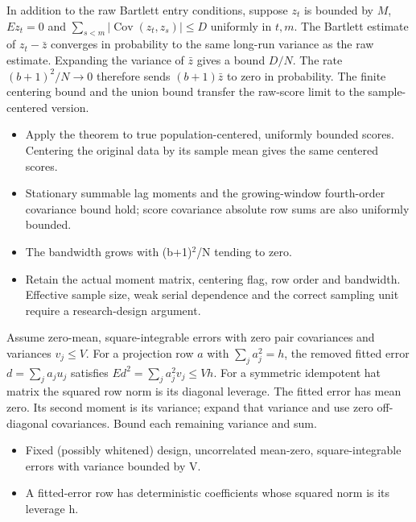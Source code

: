 \expandafter\def\csname statadic@statement@STATADIC-HAC-007\endcsname{In addition to the raw Bartlett entry conditions, suppose
  $z_t$ is bounded by $M$, $E z_t=0$ and
  $\sum_{s<m}|\operatorname{Cov}(z_t,z_s)|\le D$ uniformly in $t,m$.
  The Bartlett estimate of $z_t-\bar z$ converges in probability to the
  same long-run variance as the raw estimate.}
\expandafter\def\csname statadic@proof@STATADIC-HAC-007\endcsname{Expanding the variance of $\bar z$ gives a bound $D/N$.
  The rate $(b+1)^2/N\to0$ therefore sends $(b+1)\bar z$ to zero in
  probability. The finite centering bound and the union bound transfer the
  raw-score limit to the sample-centered version.}
\expandafter\def\csname statadic@assumptions@STATADIC-HAC-007\endcsname{\begin{itemize}
\item Apply the theorem to true population-centered, uniformly bounded scores. Centering the original data by its sample mean gives the same centered scores.
\item Stationary summable lag moments and the growing-window fourth-order covariance bound hold; score covariance absolute row sums are also uniformly bounded.
\item The bandwidth grows with (b+1)\ensuremath{{}^2}/N tending to zero.
\end{itemize}}
\expandafter\def\csname statadic@diagnostics@STATADIC-HAC-007\endcsname{\begin{itemize}
\item Retain the actual moment matrix, centering flag, row order and bandwidth. Effective sample size, weak serial dependence and the correct sampling unit require a research-design argument.
\end{itemize}}
\expandafter\def\csname statadic@statement@STATADIC-HC-001\endcsname{Assume zero-mean, square-integrable errors with zero
  pair covariances and variances $v_j\le V$. For a projection row $a$ with
  $\sum_j a_j^2=h$, the removed fitted error $d=\sum_j a_j u_j$ satisfies
  $E d^2=\sum_j a_j^2 v_j\le Vh$. For a symmetric idempotent hat matrix
  the squared row norm is its diagonal leverage.}
\expandafter\def\csname statadic@proof@STATADIC-HC-001\endcsname{The fitted error has mean zero. Its second moment is its
  variance; expand that variance and use zero off-diagonal covariances.
  Bound each remaining variance and sum.}
\expandafter\def\csname statadic@assumptions@STATADIC-HC-001\endcsname{\begin{itemize}
\item Fixed (possibly whitened) design, uncorrelated mean-zero, square-integrable errors with variance bounded by V.
\item A fitted-error row has deterministic coefficients whose squared norm is its leverage h.
\end{itemize}}

